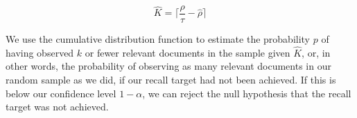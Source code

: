 \documentclass{bmcart}
\begin{document}
	\begin{equation}
		\hat{K} = \lceil \frac{\rho}{\tau} - \hat{\rho} \rceil
	\end{equation}
	
	We use the cumulative distribution function to estimate the probability $p$ of having observed $k$ or fewer relevant documents in the sample given $\hat{K}$, or, in other words, the probability of observing as many relevant documents in our random sample as we did, if our recall target had not been achieved.  If this is below our confidence level $1 - \alpha$, we can reject the null hypothesis that the recall target was not achieved.
	
	
	
	
%	
%
%
%
%	
%	
\end{document}
